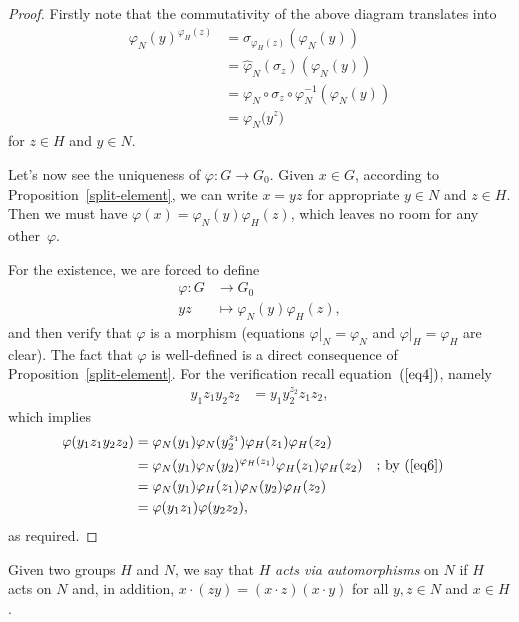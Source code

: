 \begin{proof} Firstly note that the commutativity of the above diagram translates into
\begin{align}
    \varphi_N(y)^{\varphi_H(z)}
        &= \sigma_{\varphi_H(z)}(\varphi_N(y))\nonumber\\
        &= \hat\varphi_N(\sigma_z)(\varphi_N(y))\nonumber\\
        &= \varphi_N\circ\sigma_z\circ\varphi_N^{-1}(\varphi_N(y))\nonumber\\
        &= \varphi_N\big(y^z\big)\label{eq6}
\end{align}
for $z\in H$ and $y\in N$.

Let's now see the uniqueness of $\varphi\colon G\to G_0$. Given $x\in G$, according to Proposition~\ref{split-element}, we can write $x=yz$ for appropriate $y\in N$ and $z\in H$. Then we must have $\varphi(x)=\varphi_N(y)\varphi_H(z)$, which leaves no room for any other~$\varphi$.

For the existence, we are forced to define
\begin{align*}
    \varphi\colon G&\to G_0\\
    yz&\mapsto\varphi_N(y)\varphi_H(z),
\end{align*}
and then verify that $\varphi$ is a morphism (equations $\varphi|_N=\varphi_N$ and $\varphi|_H=\varphi_H$ are clear). The fact that $\varphi$ is well-defined is a direct consequence of Proposition~\ref{split-element}. For the verification recall equation~$(\ref{eq4})$, namely
\begin{align*}
    y_1z_1y_2z_2 &= y_1y_2^{z_2}z_1z_2,
\end{align*}
which implies
\begin{align*}
    \varphi(y_1z_1y_2z_2)
        &= \varphi_N(y_1)\varphi_N(y_2^{z_1})
            \varphi_H(z_1)\varphi_H(z_2)\\
        &= \varphi_N(y_1)\varphi_N(y_2)^{\varphi_H(z_1)}
            \varphi_H(z_1)\varphi_H(z_2)
                &&\textrm{; by $(\ref{eq6})$}\\
        &= \varphi_N(y_1)\varphi_H(z_1)\varphi_N(y_2)\varphi_H(z_2)\\
        &= \varphi(y_1z_1)\varphi(y_2z_2),
\end{align*}
as required.  \end{proof}

\begin{defn}
    Given two groups\/ $H$ and\/ $N$, we say that\/ $H$ \textsl{acts via automorphisms} on\/ $N$ if\/ $H$ acts on\/ $N$ and, in addition, $x\cdot(zy) = (x\cdot z)(x\cdot y)$ for all\/ $y,z\in N$ and\/ $x\in H$.
\end{defn}

